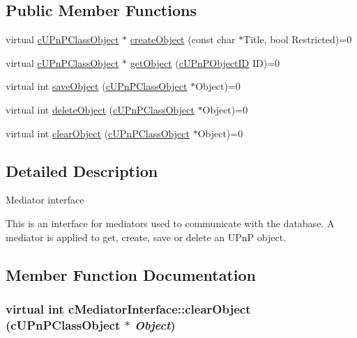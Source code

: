\subsection*{Public Member Functions}
\begin{CompactItemize}
\item 
virtual \hyperlink{classcUPnPClassObject}{cUPnPClassObject} $\ast$ \hyperlink{classcMediatorInterface_68a8350f7ea5ccd2496580035228b1fc}{createObject} (const char $\ast$Title, bool Restricted)=0
\item 
virtual \hyperlink{classcUPnPClassObject}{cUPnPClassObject} $\ast$ \hyperlink{classcMediatorInterface_716ad95bf6ac5a10e9409ced7a63a9d8}{getObject} (\hyperlink{structcUPnPObjectID}{cUPnPObjectID} ID)=0
\item 
virtual int \hyperlink{classcMediatorInterface_a2f40e697f499c64cfd007aa70e3da7e}{saveObject} (\hyperlink{classcUPnPClassObject}{cUPnPClassObject} $\ast$Object)=0
\item 
virtual int \hyperlink{classcMediatorInterface_ffbddb7fe72554b9cde9d02648cf8f0e}{deleteObject} (\hyperlink{classcUPnPClassObject}{cUPnPClassObject} $\ast$Object)=0
\item 
virtual int \hyperlink{classcMediatorInterface_cd087c690154d43ac5ef92c5a42f2349}{clearObject} (\hyperlink{classcUPnPClassObject}{cUPnPClassObject} $\ast$Object)=0
\end{CompactItemize}


\subsection{Detailed Description}
Mediator interface

This is an interface for mediators used to communicate with the database. A mediator is applied to get, create, save or delete an UPnP object. 

\subsection{Member Function Documentation}
\hypertarget{classcMediatorInterface_cd087c690154d43ac5ef92c5a42f2349}{
\subsubsection[{clearObject}]{\setlength{\rightskip}{0pt plus 5cm}virtual int cMediatorInterface::clearObject ({\bf cUPnPClassObject} $\ast$ {\em Object})}}
\label{classcMediatorInterface_cd087c690154d43ac5ef92c5a42f2349}


